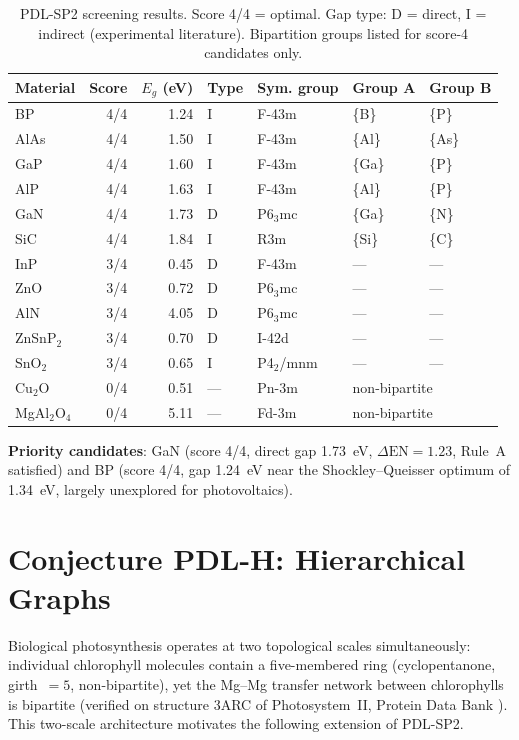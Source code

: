 \documentclass[12pt,a4paper]{article}
\newcommand{\DEN}{\Delta\mathrm{EN}}
\begin{document}
\begin{table}[h]
\centering
\caption{PDL-SP2 screening results. Score 4/4 = optimal.
Gap type: D = direct, I = indirect (experimental literature).
Bipartition groups listed for score-4 candidates only.}
\label{tab:screening}
\begin{tabular}{lrrllll}
\toprule
Material & Score & $E_g$ (eV) & Type & Sym. group & Group A & Group B \\
\midrule
BP       & 4/4 & 1.24 & I & F-43m & \{B\}  & \{P\}  \\
AlAs     & 4/4 & 1.50 & I & F-43m & \{Al\} & \{As\} \\
GaP      & 4/4 & 1.60 & I & F-43m & \{Ga\} & \{P\}  \\
AlP      & 4/4 & 1.63 & I & F-43m & \{Al\} & \{P\}  \\
GaN      & 4/4 & 1.73 & D & P6$_3$mc & \{Ga\} & \{N\}  \\
SiC      & 4/4 & 1.84 & I & R3m & \{Si\} & \{C\}  \\
\midrule
InP      & 3/4 & 0.45 & D & F-43m & — & — \\
ZnO      & 3/4 & 0.72 & D & P6$_3$mc & — & — \\
AlN      & 3/4 & 4.05 & D & P6$_3$mc & — & — \\
ZnSnP$_2$ & 3/4 & 0.70 & D & I-42d & — & — \\
SnO$_2$  & 3/4 & 0.65 & I & P4$_2$/mnm & — & — \\
\midrule
Cu$_2$O  & 0/4 & 0.51 & — & Pn-3m & \multicolumn{2}{l}{non-bipartite} \\
MgAl$_2$O$_4$ & 0/4 & 5.11 & — & Fd-3m & \multicolumn{2}{l}{non-bipartite} \\
\bottomrule
\end{tabular}
\end{table}

\textbf{Priority candidates}: GaN (score 4/4, direct gap 1.73~eV,
$\DEN = 1.23$, Rule~A satisfied) and BP (score 4/4, gap 1.24~eV
near the Shockley--Queisser optimum of 1.34~eV, largely unexplored
for photovoltaics).

\section{Conjecture PDL-H: Hierarchical Graphs}
\label{sec:hierarchical}

Biological photosynthesis operates at two topological scales simultaneously:
individual chlorophyll molecules contain a five-membered ring (cyclopentanone,
girth~$= 5$, non-bipartite), yet the Mg--Mg transfer network between
chlorophylls is bipartite (verified on structure 3ARC of Photosystem~II,
Protein Data Bank \cite{Umena2011}). This two-scale architecture motivates
the following extension of PDL-SP2.
\end{document}
